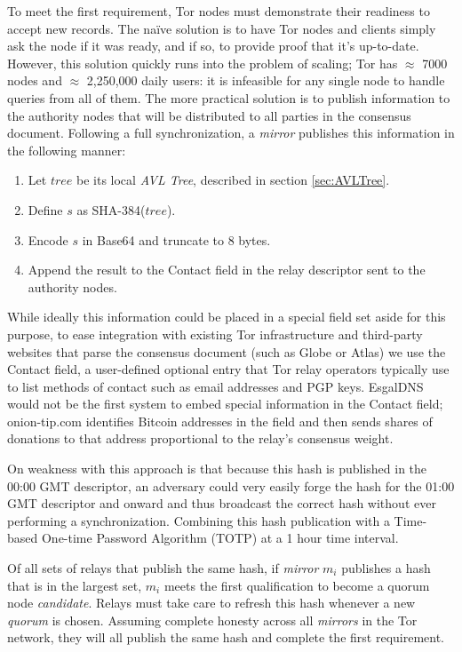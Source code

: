 To meet the first requirement, Tor nodes must demonstrate their readiness to accept new records. The na\"{i}ve solution is to have Tor nodes and clients simply ask the node if it was ready, and if so, to provide proof that it's up-to-date. However, this solution quickly runs into the problem of scaling; Tor has $ \approx $ 7000 nodes and $ \approx $ 2,250,000 daily users\cite{TorMetrics}: it is infeasible for any single node to handle queries from all of them. The more practical solution is to publish information to the authority nodes that will be distributed to all parties in the consensus document. Following a full synchronization, a \emph{mirror} publishes this information in the following manner:

\begin{enumerate}
	\item Let $ tree $ be its local \emph{AVL Tree}, described in section \ref{sec:AVLTree}.
	\item Define $ s $ as SHA-384($ tree $).
	\item Encode $ s $ in Base64 and truncate to 8 bytes.
	\item Append the result to the Contact field in the relay descriptor sent to the authority nodes.
\end{enumerate}

While ideally this information could be placed in a special field set aside for this purpose, to ease integration with existing Tor infrastructure and third-party websites that parse the consensus document (such as Globe or Atlas) we use the Contact field, a user-defined optional entry that Tor relay operators typically use to list methods of contact such as email addresses and PGP keys. EsgalDNS would not be the first system to embed special information in the Contact field; onion-tip.com identifies Bitcoin addresses in the field and then sends shares of donations to that address proportional to the relay's consensus weight.

On weakness with this approach is that because this hash is published in the 00:00 GMT descriptor, an adversary could very easily forge the hash for the 01:00 GMT descriptor and onward and thus broadcast the correct hash without ever performing a synchronization. Combining this hash publication with a Time-based One-time Password Algorithm (TOTP) at a 1 hour time interval.

Of all sets of relays that publish the same hash, if \emph{mirror} $ m_{i} $ publishes a hash that is in the largest set, $ m_{i} $ meets the first qualification to become a quorum node \emph{candidate}. Relays must take care to refresh this hash whenever a new \emph{quorum} is chosen. Assuming complete honesty across all \emph{mirrors} in the Tor network, they will all publish the same hash and complete the first requirement.

